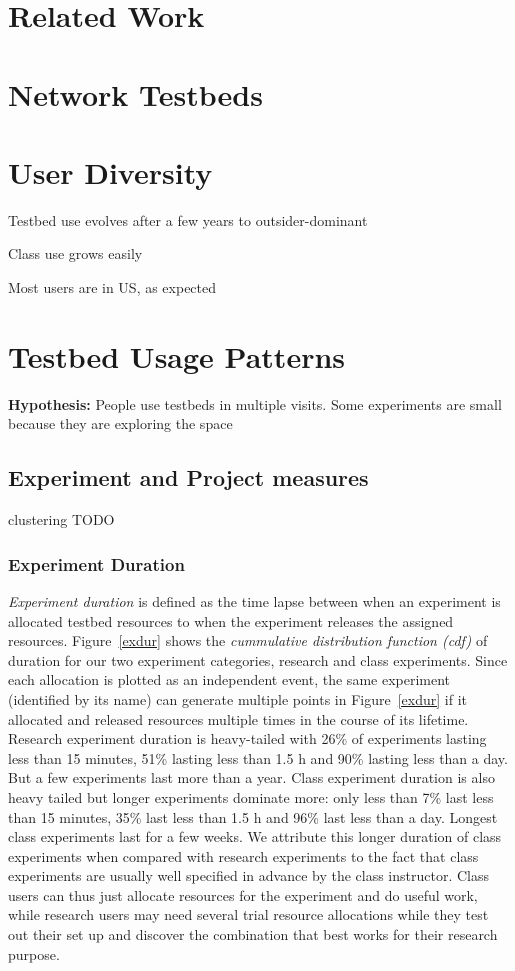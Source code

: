 \documentclass[10pt]{article}
\begin{document}
\section{Related Work}

\section{Network Testbeds}

\section{User Diversity}

Testbed use evolves after a few years to outsider-dominant

Class use grows easily

Most users are in US, as expected

\section{Testbed Usage Patterns}

\textbf{Hypothesis:} People use testbeds in multiple visits. Some experiments are small because they are exploring the space

\subsection{Experiment and Project measures}

{\color{red} clustering TODO}


\subsubsection{Experiment Duration}
 {\it Experiment duration} is defined 
 as the time lapse between
  when an experiment is allocated 
   testbed resources 
 to when the experiment releases
  the assigned resources.
Figure~\ref{exdur} shows the \textit{cummulative distribution function (cdf)} of
 duration for our two 
  experiment categories, research and class
   experiments. 
Since each allocation is plotted as an 
 independent event, the same experiment (identified by its name) can generate multiple
 points in Figure~\ref{exdur} if it allocated and released resources multiple times in the course
 of its lifetime.
Research experiment duration is heavy-tailed with 26\% of experiments
lasting less than 15 minutes, 51\% lasting less than 1.5 h and 90\%
lasting less than a day. But a few experiments last more than a year. 
Class experiment duration is also heavy tailed but longer experiments
dominate more: only less than 7\% last less than 15 minutes, 35\% last
less than 1.5 h and 96\% last less than a day. Longest class experiments
last for a few weeks. We attribute this longer duration of class
experiments when compared with research experiments to the fact that
class experiments are usually well specified in advance by the class
instructor. Class users can thus just allocate resources for the experiment and do
useful work, while research users may need several trial resource
allocations while they test out their set up and discover the combination
that best works for their research purpose.
\end{document}
